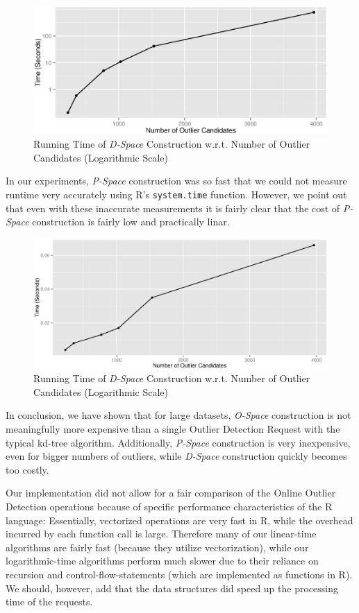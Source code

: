 \documentclass[runningheads]{llncs}
\begin{document}
\begin{figure}[H]
\includegraphics[width=\textwidth]{images/num_ocs_vs_dspace.eps}
\caption{Running Time of \emph{D-Space} Construction w.r.t. Number of Outlier Candidates (Logarithmic Scale)}
\end{figure}

In our experiments, \emph{P-Space} construction was so fast that we could not measure runtime very accurately using R's \texttt{system.time} function. However, we point out that even with these inaccurate measurements it is fairly clear that the cost of \emph{P-Space} construction is fairly low and practically linar.

\begin{figure}[H]
\includegraphics[width=\textwidth]{images/pspace_vs_ocs.eps}
\caption{Running Time of \emph{D-Space} Construction w.r.t. Number of Outlier Candidates (Logarithmic Scale)}
\end{figure}

In conclusion, we have shown that for large datasets, \emph{O-Space} construction is not meaningfully more expensive than a single Outlier Detection Request with the typical kd-tree algorithm. Additionally, \emph{P-Space} construction is very inexpensive, even for bigger numbers of outliers, while \emph{D-Space} construction quickly becomes too costly. 

Our implementation did not allow for a fair comparison of the Online Outlier Detection operations because of specific performance characteristics of the R language: Essentially, vectorized operations are very fast in R, while the overhead incurred by each function call is large. Therefore many of our linear-time algorithms are fairly fast (because they utilize vectorization), while our logarithmic-time algorithms perform much slower due to their reliance on recursion and control-flow-statements (which are implemented as functions in R). We should, however, add that the data structures did speed up the processing time of the requests.
\end{document}
